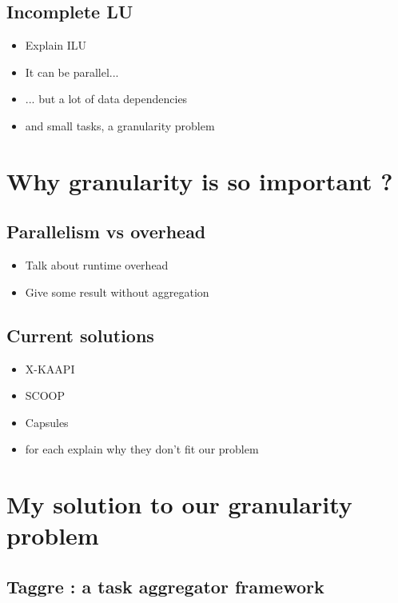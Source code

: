 \documentclass[oneside,12t]{classes/Thesis}
\begin{document}
\subsection{Incomplete LU}
  \begin{itemize}
    \item Explain ILU
    \item It can be parallel...
    \item ... but a lot of data dependencies
    \item and small tasks, a granularity problem
  \end{itemize}

\section{Why granularity is so important ?}
\subsection{Parallelism vs overhead}
  \begin{itemize}
    \item Talk about runtime overhead
    \item Give some result without aggregation
  \end{itemize}
\subsection{Current solutions}
  \begin{itemize}
    \item X-KAAPI
    \item SCOOP
    \item Capsules
    \item for each explain why they don't fit our problem
  \end{itemize}


\section{My solution to our granularity problem}
\subsection{Taggre : a task aggregator framework}
\end{document}
